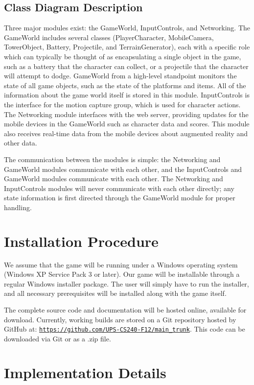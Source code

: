 \documentclass[10pt,letterpaper,oneside,english]{article}
\newcommand{\chref}[2]{\href{#1}{{\color{blue!60!black}#2}}}
\newcommand{\code}[1]{\texttt{#1}}
\begin{document}
\subsection{Class Diagram Description}
Three major modules exist: the GameWorld, InputControls, and Networking. The GameWorld includes several classes (PlayerCharacter, MobileCamera, TowerObject, Battery, Projectile, and TerrainGenerator), each with a specific role which can typically be thought of as encapsulating a single object in the game, such as a battery that the character can collect, or a projectile that the character will attempt to dodge. GameWorld from a high-level standpoint monitors the state of all game objects, such as the state of the platforms and items. All of the information about the game world itself is stored in this module. InputControls is the interface for the motion capture group, which is used for character actions. The Networking module interfaces with the web server, providing updates for the mobile devices in the GameWorld such as character data and scores. This module also receives real-time data from the mobile devices about augmented reality and other data.

The communication between the modules is simple: the Networking and GameWorld modules communicate with each other, and the InputControls and GameWorld modules communicate with each other. The Networking and InputControls modules will never communicate with each other directly; any state information is first directed through the GameWorld module for proper handling.

\section{Installation Procedure}
We assume that the game will be running under a Windows operating system (Windows XP Service Pack 3 or later). Our game will be installable through a regular Windows installer package. The user will simply have to run the installer, and all necessary prerequisites will be installed along with the game itself.

The complete source code and documentation will be hosted online, available for download. Currently, working builds are stored on a Git repository hosted by GitHub at: \chref{https://github.com/UPS-CS240-F12/main_trunk}{\code{https://github.com/UPS-CS240-F12/main\_trunk}}. This code can be downloaded via Git or as a .zip file.

\section{Implementation Details}
\end{document}
